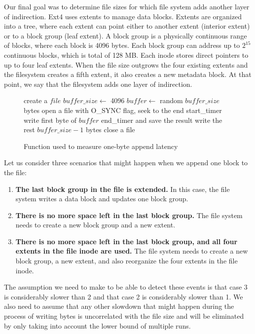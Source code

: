 Our final goal was to determine file sizes for which file system adds another layer of indirection. Ext4 uses extents to manage data blocks. Extents are organized into a tree, where each extent can point either to another extent (interior extent) or to a block group (leaf extent). A block group is a physically continuous range of blocks, where each block is 4096 bytes. Each block group can address up to $2^{15}$ continuous blocks, which is total of 128 MB. Each inode stores direct pointers to up to four leaf extents. When the file size outgrows the four existing extents and the filesystem creates a fifth extent, it also creates a new metadata block. At that point, we say that the filesystem adds one layer of indirection.

\begin{figure}[t!]
\begin{algorithmic}
\STATE create a $file$
\STATE $buffer\_size \leftarrow$ 4096
\STATE $buffer \leftarrow$ random $buffer\_size$ bytes
\STATE open a file with O\_SYNC flag, seek to the end
\STATE start\_timer
\STATE write first byte of $buffer$
\STATE end\_timer and save the result
\STATE write the rest $buffer\_size - 1$ bytes
\STATE close a file
\ENDFOR
\end{algorithmic}
\caption{Function used to measure one-byte append latency}
\label{fig:p4pseudo}
\end{figure}



Let us consider three scenarios that might happen when we append one block to the file:
\begin{enumerate}
\item \textbf{The last block group in the file is extended.} In this case, the file system writes a data block and updates one block group.
\item \textbf{There is no more space left in the last block group.} The file system needs to create a new block group and a new extent.
\item \textbf{There is no more space left in the last block group, and all four extents in the file inode are used.} The file system needs to create a new block group, a new extent, and also reorganize the four extents in the file inode.
\end{enumerate}

The assumption we need to make to be able to detect these events is that case 3 is considerably slower than 2 and that case 2 is considerably slower than 1. We also need to assume that any other slowdown that might happen during the process of writing bytes is uncorrelated with the file size and will be eliminated by only taking into account the lower bound of multiple runs.

